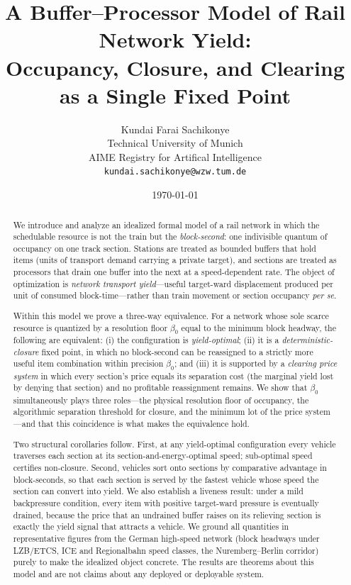 \documentclass[11pt,twocolumn,a4paper]{article}
\title{A Buffer--Processor Model of Rail Network Yield:\\
Occupancy, Closure, and Clearing as a Single Fixed Point}
\author{%
Kundai Farai Sachikonye\\
\small Technical University of Munich\\
\small AIME Registry for Artifical Intelligence\\
\small \texttt{kundai.sachikonye@wzw.tum.de}}
\date{\today}
\theoremstyle{definition}
\theoremstyle{remark}
\newcommand{\blocktime}{\beta_0}
\begin{document}
\maketitle

\begin{abstract}
We introduce and analyze an idealized formal model of a rail network in which the schedulable resource is not the train but the \emph{block-second}: one indivisible quantum of occupancy on one track section. Stations are treated as bounded buffers that hold items (units of transport demand carrying a private target), and sections are treated as processors that drain one buffer into the next at a speed-dependent rate. The object of optimization is \emph{network transport yield}---useful target-ward displacement produced per unit of consumed block-time---rather than train movement or section occupancy \emph{per se}.

Within this model we prove a three-way equivalence. For a network whose sole scarce resource is quantized by a resolution floor $\blocktime$ equal to the minimum block headway, the following are equivalent: (i) the configuration is \emph{yield-optimal}; (ii) it is a \emph{deterministic-closure} fixed point, in which no block-second can be reassigned to a strictly more useful item combination within precision $\blocktime$; and (iii) it is supported by a \emph{clearing price system} in which every section's price equals its separation cost (the marginal yield lost by denying that section) and no profitable reassignment remains. We show that $\blocktime$ simultaneously plays three roles---the physical resolution floor of occupancy, the algorithmic separation threshold for closure, and the minimum lot of the price system---and that this coincidence is what makes the equivalence hold.

Two structural corollaries follow. First, at any yield-optimal configuration every vehicle traverses each section at its section-and-energy-optimal speed; sub-optimal speed certifies non-closure. Second, vehicles sort onto sections by comparative advantage in block-seconds, so that each section is served by the fastest vehicle whose speed the section can convert into yield. We also establish a liveness result: under a mild backpressure condition, every item with positive target-ward pressure is eventually drained, because the price that an undrained buffer raises on its relieving section is exactly the yield signal that attracts a vehicle. We ground all quantities in representative figures from the German high-speed network (block headways under LZB/ETCS, ICE and Regionalbahn speed classes, the Nuremberg--Berlin corridor) purely to make the idealized object concrete. The results are theorems about this model and are not claims about any deployed or deployable system.
\end{abstract}
\end{document}

